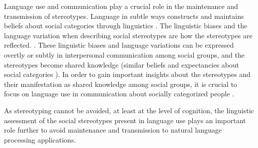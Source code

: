  Language use and communication play a crucial role in the maintenance and transmission of stereotypes. Language in subtle ways constructs and maintains beliefs about social categories through linguistics \cite{beukeboom2019stereotypes}.  The linguistic biases and the language variation when describing social stereotypes are how the stereotypes are reflected. \cite{burgers2020language}. These linguistic biases and language variations can be expressed overtly or subtly in interpersonal communication among social groups, and the stereotypes become shared knowledge (similar beliefs and expectancies about social categories \cite{beukeboom2019stereotypes}). In order to gain important insights about the stereotypes and their manifestation as shared knowledge among social groups, it is crucial to focus on language use in communication about socially categorized people \cite{beukeboom2019stereotypes}.
 
 
 
 
 
 

As stereotyping cannot be avoided, at least at the level of cognition, the linguistic assessment of the social stereotypes present in language use plays an important role further to avoid maintenance and transmission to natural language processing applications. 

